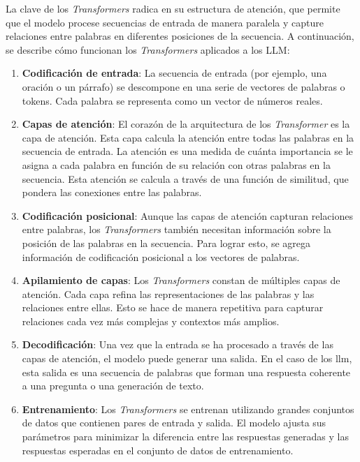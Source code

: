 La clave de los \textit{Transformers} radica en su estructura de atención, que permite que el modelo procese secuencias de entrada de manera paralela y capture relaciones entre palabras en diferentes posiciones de la secuencia\cite{Techtarget_LLM}. A continuación, se describe cómo funcionan los \textit{Transformers} aplicados a los \acrshort{LLM}:

\begin{enumerate}
    
\item \textbf{Codificación de entrada}: La secuencia de entrada (por ejemplo, una oración o un párrafo) se descompone en una serie de vectores de palabras o tokens. Cada palabra se representa como un vector de números reales.

\item \textbf{Capas de atención}: El corazón de la arquitectura de los \textit{Transformer} es la capa de atención. Esta capa calcula la atención entre todas las palabras en la secuencia de entrada. La atención es una medida de cuánta importancia se le asigna a cada palabra en función de su relación con otras palabras en la secuencia. Esta atención se calcula a través de una función de similitud, que pondera las conexiones entre las palabras.

\item \textbf{Codificación posicional}: Aunque las capas de atención capturan relaciones entre palabras, los \textit{Transformers} también necesitan información sobre la posición de las palabras en la secuencia. Para lograr esto, se agrega información de codificación posicional a los vectores de palabras.

\item \textbf{Apilamiento de capas}: Los \textit{Transformers} constan de múltiples capas de atención. Cada capa refina las representaciones de las palabras y las relaciones entre ellas. Esto se hace de manera repetitiva para capturar relaciones cada vez más complejas y contextos más amplios.

\item \textbf{Decodificación}: Una vez que la entrada se ha procesado a través de las capas de atención, el modelo puede generar una salida. En el caso de los \acrshort{llm}, esta salida es una secuencia de palabras que forman una respuesta coherente a una pregunta o una generación de texto.

\item \textbf{Entrenamiento}: Los \textit{Transformers} se entrenan utilizando grandes conjuntos de datos que contienen pares de entrada y salida. El modelo ajusta sus parámetros para minimizar la diferencia entre las respuestas generadas y las respuestas esperadas en el conjunto de datos de entrenamiento.

\end{enumerate}

